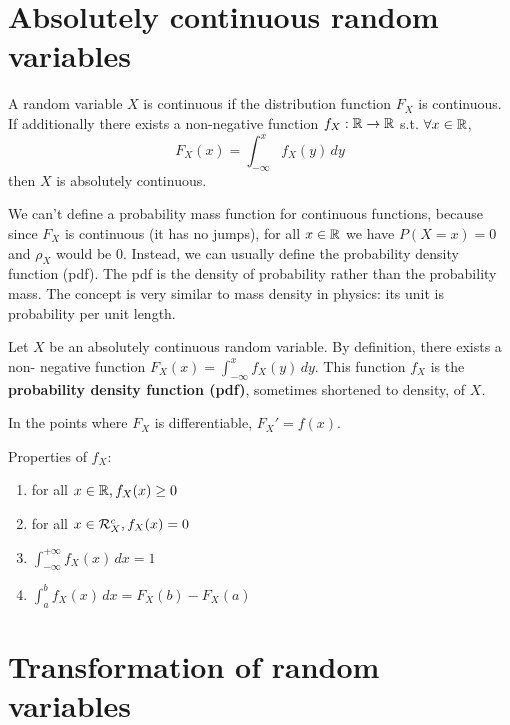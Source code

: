 \section{Absolutely continuous random variables}
\begin{definition}
    A random variable $X$ is continuous if the distribution function $F_X$ is continuous. If additionally there exists a non-negative function $f_X:\mathbb{R}\to\mathbb{R}$ s.t. $\forall x\in\mathbb{R}$,
    \begin{equation*}
        F_X(x)=\int_{-\infty}^{x} f_X(y) \,dy
    \end{equation*}
    then $X$ is absolutely continuous.
\end{definition}
We can't define a probability mass function for continuous functions, because since $F_X$ is continuous (it has no jumps), for all $x \in \mathbb{R}$ we have $P(X=x)=0$ and $\rho_X$ would be 0. Instead, we can usually define the probability density function (pdf). The pdf is the density of probability rather than the probability mass. The concept is very similar to mass density in physics: its unit is probability per unit length.
\begin{definition}
    Let $X$ be an absolutely continuous random variable. By definition, there exists a non- negative function $F_X(x)=\int_{-\infty}^{x} f_X(y) \,dy$. This function $f_X$ is the \textbf{probability density function (pdf)}, sometimes shortened to density, of $X$.
\end{definition}
\begin{remark}
    In the points where $F_X$ is differentiable, $F_X'=f(x)$.
\end{remark}
Properties of $f_X$:
\begin{enumerate}
    \item for all $x \in \mathbb{R}, f_X(x) \ge 0$
    \item for all $x \in \mathcal{R}_X^c, f_X(x)=0$
    \item $\int_{-\infty}^{+\infty}  f_X(x)\,dx =1$
    \item $\int_{a}^{b}  f_X(x)\,dx =F_X(b)-F_X(a)$
\end{enumerate}
\section{Transformation of random variables}
